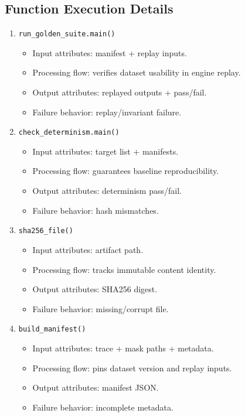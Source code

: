 \documentclass[11pt,a4paper]{article}
\begin{document}
\subsection*{Function Execution Details}
\begin{enumerate}[leftmargin=*]
  \item \texttt{run\_golden\_suite.main()}
  \begin{itemize}[leftmargin=*]
    \item Input attributes: manifest + replay inputs.
    \item Processing flow: verifies dataset usability in engine replay.
    \item Output attributes: replayed outputs + pass/fail.
    \item Failure behavior: replay/invariant failure.
  \end{itemize}
  \item \texttt{check\_determinism.main()}
  \begin{itemize}[leftmargin=*]
    \item Input attributes: target list + manifests.
    \item Processing flow: guarantees baseline reproducibility.
    \item Output attributes: determinism pass/fail.
    \item Failure behavior: hash mismatches.
  \end{itemize}
  \item \texttt{sha256\_file()}
  \begin{itemize}[leftmargin=*]
    \item Input attributes: artifact path.
    \item Processing flow: tracks immutable content identity.
    \item Output attributes: SHA256 digest.
    \item Failure behavior: missing/corrupt file.
  \end{itemize}
  \item \texttt{build\_manifest()}
  \begin{itemize}[leftmargin=*]
    \item Input attributes: trace + mask paths + metadata.
    \item Processing flow: pins dataset version and replay inputs.
    \item Output attributes: manifest JSON.
    \item Failure behavior: incomplete metadata.
  \end{itemize}
\end{enumerate}
\end{document}
